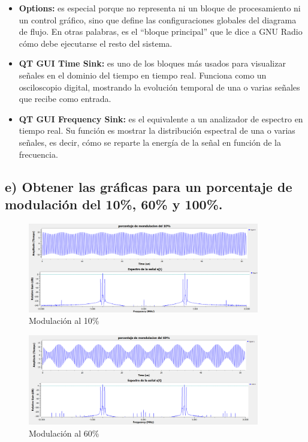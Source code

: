 \begin{itemize}
    \item \textbf{Options:} es especial porque no representa ni un bloque de procesamiento ni un control gráfico, sino que define las configuraciones globales del diagrama de flujo. En otras palabras, es el “bloque principal” que le dice a GNU Radio cómo debe ejecutarse el resto del sistema.
    \item \textbf{QT GUI Time Sink:} es uno de los bloques más usados para visualizar señales en el dominio del tiempo en tiempo real. Funciona como un osciloscopio digital, mostrando la evolución temporal de una o varias señales que recibe como entrada.
    \item \textbf{QT GUI Frequency Sink:} es el equivalente a un analizador de espectro en tiempo real. Su función es mostrar la distribución espectral de una o varias señales, es decir, cómo se reparte la energía de la señal en función de la frecuencia.
\end{itemize}

\subsection*{e) Obtener las gráficas para un porcentaje de modulación del 10\%, 60\% y 100\%.}

\begin{figure}[H]
    \centering
    \includegraphics[width=0.9\textwidth]{imagenes/Parte_1/Actividad_6/modulacion_al_10.png}
    \caption{Modulación al 10\%}
    \label{fig:8}
\end{figure}

\begin{figure}[H]
    \centering
    \includegraphics[width=0.9\textwidth]{imagenes/Parte_1/Actividad_6/modulacion_al_60.png}
    \caption{Modulación al 60\%}
    \label{fig:9}
\end{figure}

